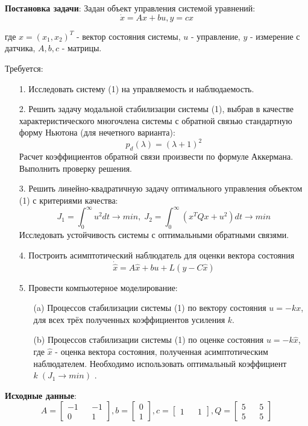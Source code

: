 
\textbf{Постановка задачи}: Задан объект управления системой уравнений:
\begin{equation}
    \dot{x}=A x+b u, y = c x \tag{1}
\end{equation} 

\noindent где $ x=(x_1, x_2)^T $ - вектор состояния системы, $ u $ - управление, $ y $ - измерение с датчика, $ A, b, c $ - матрицы.

Требуется:
\begin{itemize}
    \item[1.] Исследовать систему (1) на управляемость и наблюдаемость.
    \item[2.] Решить задачу модальной стабилизации системы (1), выбрав в качестве характеристического многочлена системы с обратной связью стандартную форму Ньютона (для нечетного варианта):
    \begin{equation}
        p_d(\lambda)=(\lambda + 1)^2 \tag{2}
    \end{equation}
	Расчет коэффициентов обратной связи произвести по формуле Аккермана. Выполнить проверку решения.
    \item[3.] Решить линейно-квадратичную задачу оптимального управления объектом (1) с критериями качества:
    \begin{equation}
        J_1=\int^{\infty}_0 u^2 dt \rightarrow min, \; J_2=\int^{\infty}_0 (x^T Qx+u^2) dt \rightarrow min \tag{3}
    \end{equation}
    Исследовать устойчивость системы с оптимальными обратными связями.
    \item[4.] Построить асимптотический наблюдатель для оценки вектора состояния
    \begin{equation}
        \dot{\hat{x}}=A \hat{x} + b u + L(y - C \hat{x}) \tag{4}
    \end{equation} 
    \item[5.] Провести компьютерное моделирование:
    \begin{itemize}
        \item[(a)] Процессов стабилизации системы (1) по вектору состояния $ u=-kx $, для всех трёх полученных коэффициентов усиления $ k $.
        \item[(b)] Процессов стабилизации системы (1) по оценке состояния $ u=-k \hat{x} $, где $ \hat{x} $ - оценка вектора состояния, полученная асимптотическим наблюдателем. Необходимо использовать оптимальный коэффициент $ k \; (J_1 \rightarrow min) $ . 
    \end{itemize} 
\end{itemize}

\textbf{Исходные данные}:
$$
A = \begin{bmatrix}
    -1 && -1 \\ 0 && 1
\end{bmatrix}, b = \begin{bmatrix}
    0 \\ 1
\end{bmatrix}, c = \begin{bmatrix}
    1 && 1
\end{bmatrix}, Q = \begin{bmatrix}
    5 && 5 \\ 5 && 5
\end{bmatrix}
$$
